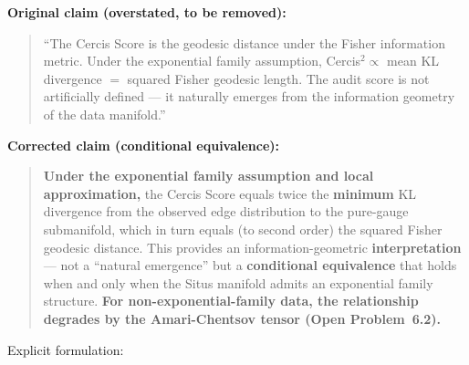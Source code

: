 \documentclass{article}
\begin{document}
{\bf Original claim (overstated, to be removed):}
\begin{quote}
``The Cercis Score is the geodesic distance under the Fisher information metric.
Under the exponential family assumption, Cercis${}^2 \propto$ mean KL divergence
$=$ squared Fisher geodesic length. The audit score is not artificially defined —
it naturally emerges from the information geometry of the data manifold.''
\end{quote}

{\bf Corrected claim (conditional equivalence):}
\begin{quote}
{\bf Under the exponential family assumption and local approximation,} the Cercis Score
equals twice the {\bf minimum} KL divergence from the observed edge distribution to the
pure-gauge submanifold, which in turn equals (to second order) the squared Fisher geodesic
distance. This provides an information-geometric {\bf interpretation} — not a ``natural emergence''
but a {\bf conditional equivalence} that holds when and only when the Situs manifold
admits an exponential family structure.
{\bf For non-exponential-family data, the relationship degrades by the Amari-Chentsov
tensor (Open Problem~6.2).}
\end{quote}

Explicit formulation:
\end{document}
